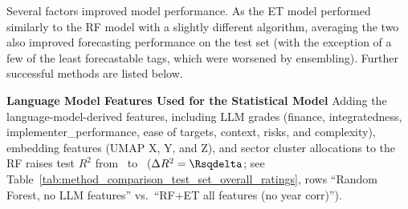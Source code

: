 \documentclass[12pt,a4paper]{article}
\newcommand{\subsubsubsection}[1]{\paragraph{#1}\mbox{}\\}
\begin{document}
Several factors improved model performance. As the ET model performed similarly to the RF model with a slightly different algorithm, averaging the two also improved forecasting performance on the test set (with the exception of a few of the least forecastable tags, which were worsened by ensembling). Further successful methods are listed below.


\textbf{Language Model Features Used for the Statistical Model}
Adding the language-model-derived features, including LLM grades (finance, integratedness, implementer\_performance, ease of targets, context, risks, and complexity), embedding features (UMAP X, Y, and Z), and sector cluster allocations to the RF raises test $R^2$ from \Rsqnollmfrac\ to \Rsqheldoutratingsllmfeatures\ ($\Delta R^2 = \Rsqdelta$; see Table~\ref{tab:method_comparison_test_set_overall_ratings}, rows ``Random Forest, no LLM features'' vs.\ ``RF+ET all features  (no year corr)'').                                       
                                                                             



\end{document}

